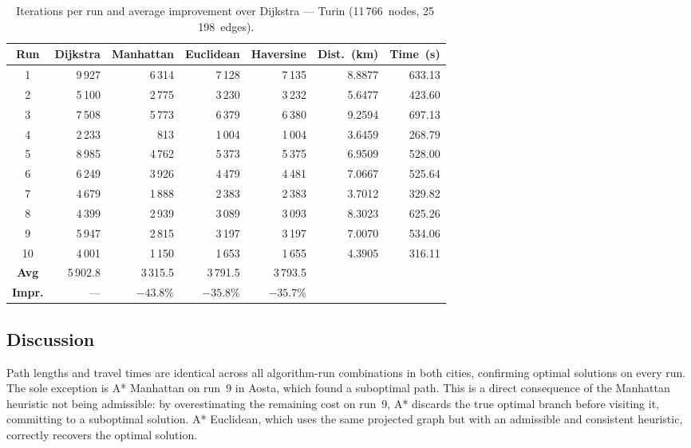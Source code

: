 \documentclass[12pt,a4paper]{article}
\begin{document}
\begin{table}[H]
  \centering
  \small
  \setlength{\tabcolsep}{5pt}
  \begin{tabular}{crrrrrr}
    \toprule
    \textbf{Run} & \textbf{Dijkstra} & \textbf{Manhattan} & \textbf{Euclidean} & \textbf{Haversine} & \textbf{Dist.~(km)} & \textbf{Time~(s)} \\
    \midrule
    1  & 9\,927 & 6\,314 & 7\,128 & 7\,135 & 8.8877 & 633.13 \\
    2  & 5\,100 & 2\,775 & 3\,230 & 3\,232 & 5.6477 & 423.60 \\
    3  & 7\,508 & 5\,773 & 6\,379 & 6\,380 & 9.2594 & 697.13 \\
    4  & 2\,233 &   813 & 1\,004 & 1\,004 & 3.6459 & 268.79 \\
    5  & 8\,985 & 4\,762 & 5\,373 & 5\,375 & 6.9509 & 528.00 \\
    6  & 6\,249 & 3\,926 & 4\,479 & 4\,481 & 7.0667 & 525.64 \\
    7  & 4\,679 & 1\,888 & 2\,383 & 2\,383 & 3.7012 & 329.82 \\
    8  & 4\,399 & 2\,939 & 3\,089 & 3\,093 & 8.3023 & 625.26 \\
    9  & 5\,947 & 2\,815 & 3\,197 & 3\,197 & 7.0070 & 534.06 \\
    10 & 4\,001 & 1\,150 & 1\,653 & 1\,655 & 4.3905 & 316.11 \\
    \midrule
    \textbf{Avg}   & 5\,902.8 & 3\,315.5 & 3\,791.5 & 3\,793.5 & & \\
    \textbf{Impr.} & ---      & $-43.8\%$ & $-35.8\%$ & $-35.7\%$ & & \\
    \bottomrule
  \end{tabular}
  \caption{Iterations per run and average improvement over Dijkstra --- Turin (11\,766~nodes, 25\,198~edges).}
  \label{tab:results_turin}
\end{table}

\subsection{Discussion}

Path lengths and travel times are identical across all algorithm-run combinations in both cities, confirming optimal solutions on every run.
The sole exception is A* Manhattan on run~9 in Aosta, which found a suboptimal path.
This is a direct consequence of the Manhattan heuristic not being admissible: by overestimating the remaining cost on run~9, A* discards the true optimal branch before visiting it, committing to a suboptimal solution.
A* Euclidean, which uses the same projected graph but with an admissible and consistent heuristic, correctly recovers the optimal solution.
\end{document}
